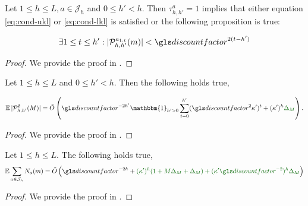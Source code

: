 \begin{lemma}
	\label{lemma:size_Ph}
	\begin{leftbar}[lemmabar]
	Let $1 \leq h \leq L,  a\in \mathcal{J}_h$ and $0\leq h'<h$. Then $\tau^a_{h,h'}=1$ implies that either equation \eqref{eq:cond-ukl} or \eqref{eq:cond-lkl} is satisfied or the following proposition is true:
	
	
	\begin{equation}
	\label{eq:P-min-size}
	\exists 1\leq t \leq h': |\mathcal{P}_{h,h'}^{a_{1:t}}(m)| < \discount^{2(t-h')}
	\end{equation}
	\end{leftbar}
\end{lemma}
\begin{proof}
	We provide the proof in .
\end{proof}

\begin{lemma}
	\label{lemma:expected-P-size}
    \begin{leftbar}[lemmabar]
	Let $1\leq h\leq L$ and $0 \leq h' < h$. Then the following holds true,
	
	\begin{equation*}
	\expectedvalue |\mathcal{P}^\emptyset_{h,h'}(M)| = \tilde{O}\left(\discount^{-2h'}\mathbbm{1}_{h'>0}\sum_{t=0}^{h'}(\discount^2 \kappa')^t + (\kappa')^h\diff{\Delta_M} \right).
	\end{equation*}
	\end{leftbar}
\end{lemma}
\begin{proof}
	We provide the proof in .
\end{proof}

\begin{lemma}
	\label{lemma:expected-plays-count}
	\begin{leftbar}[lemmabar]
	Let $1\leq h\leq L$. The following holds true,
	\begin{equation*}
	\expectedvalue \sum_{a\in \mathcal{J}_h} N_a(m) = \tilde{O}\left(\discount^{-2h} + \diff{(\kappa')^h(1+M\Delta_M+\Delta_M) + (\kappa'\discount^{-2})^h\Delta_M}\right)
	\end{equation*}
	\end{leftbar}
\end{lemma}
\begin{proof}
	We provide the proof in .
\end{proof}

